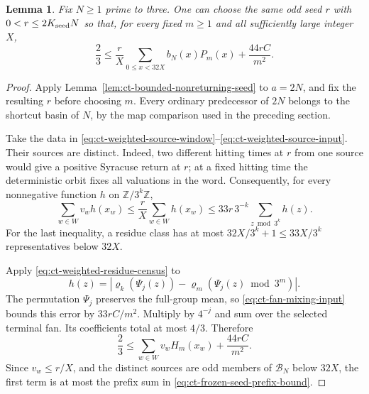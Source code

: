 \documentclass[11pt,a4paper]{article}
\newtheorem{lemma}[theorem]{Lemma}
\begin{document}
\begin{lemma}\label{lem:ct-frozen-seed-prefix-bound}
Fix \(N\ge1\) prime to three. One can choose the same odd seed
\(r\) with \(0<r\le2K_{\rm seed}N\) so that, for every fixed
\(m\ge1\) and all sufficiently large integer \(X\),
\begin{equation}\label{eq:ct-frozen-seed-prefix-bound}
 \frac23\le\frac rX\sum_{0\le x<32X}b_N(x)P_m(x)
                   +\frac{44rC}{m^2}.
\end{equation}
\end{lemma}
\begin{proof}
Apply Lemma~\ref{lem:ct-bounded-nonreturning-seed} to \(a=2N\),
and fix the resulting \(r\) before choosing \(m\). Every ordinary
predecessor of \(2N\) belongs to the shortcut basin of \(N\), by
the map comparison used in the preceding section.

Take the data in \eqref{eq:ct-weighted-source-window}--\eqref{eq:ct-weighted-source-input}.
Their sources are distinct. Indeed, two different hitting times at
\(r\) from one source would give a positive Syracuse return at
\(r\); at a fixed hitting time the deterministic orbit fixes all
valuations in the word. Consequently, for every nonnegative function
\(h\) on \(\mathbb Z/3^k\mathbb Z\),
\begin{equation}\label{eq:ct-weighted-residue-census}
 \sum_{w\in W}v_wh(x_w)
 \le\frac rX\sum_{w\in W}h(x_w)
 \le33r\,3^{-k}\sum_{z\bmod3^k}h(z).
\end{equation}
For the last inequality, a residue class has at most
\(32X/3^k+1\le33X/3^k\) representatives below \(32X\).

Apply \eqref{eq:ct-weighted-residue-census} to
\[
 h(z)=|\varrho_k(\Psi_j(z))
             -\varrho_m(\Psi_j(z)\bmod3^m)|.
\]
The permutation \(\Psi_j\) preserves the full-group mean, so
\eqref{eq:ct-fan-mixing-input} bounds this error by \(33rC/m^2\).
Multiply by \(4^{-j}\) and sum over the selected terminal fan.
Its coefficients total at most \(4/3\). Therefore
\[
 \frac23\le\sum_{w\in W}v_wH_m(x_w)+\frac{44rC}{m^2}.
\]
Since \(v_w\le r/X\), and the distinct sources are odd members
of \(\mathcal B_N\) below \(32X\), the first term is at most
the prefix sum in \eqref{eq:ct-frozen-seed-prefix-bound}.
\end{proof}
\end{document}
